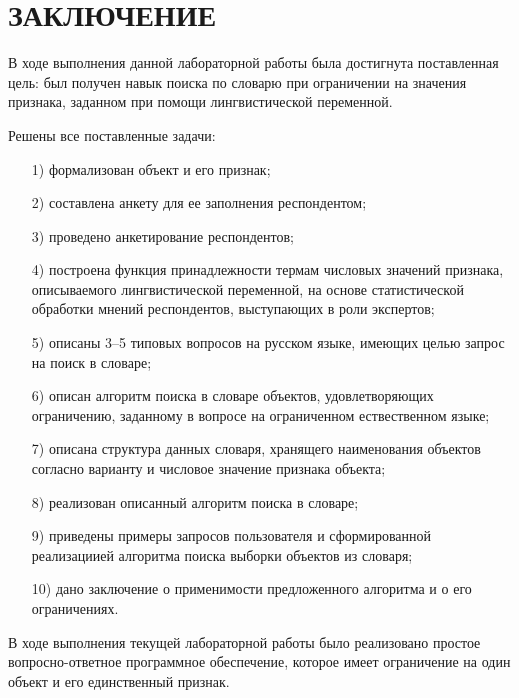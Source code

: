 {\centering \chapter*{ЗАКЛЮЧЕНИЕ}}

В ходе выполнения данной лабораторной работы была достигнута поставленная цель: был получен навык поиска по словарю при ограничении на значения признака, заданном при помощи лингвистической переменной.

Решены все поставленные задачи:
\begin{enumerate}
\item[1)] формализован объект и его признак;
\item[2)] составлена анкету для ее заполнения респондентом;
\item[3)] проведено анкетирование респондентов;
\item[4)] построена функция принадлежности термам числовых значений признака, описываемого лингвистической переменной, на основе статистической обработки мнений респондентов, выступающих в роли экспертов;
\item[5)] описаны 3--5 типовых вопросов на русском языке, имеющих целью запрос на поиск в словаре;
\item[6)] описан алгоритм поиска в словаре объектов, удовлетворяющих ограничению, заданному в вопросе на ограниченном ествественном языке;
\item[7)] описана структура данных словаря, хранящего наименования объектов согласно варианту и числовое значение признака объекта;
\item[8)] реализован описанный алгоритм поиска в словаре;
\item[9)] приведены примеры запросов пользователя и сформированной реализациией алгоритма поиска выборки объектов из словаря;
\item[10)] дано заключение о применимости предложенного алгоритма и о его ограничениях.
\end{enumerate}

В ходе выполнения текущей лабораторной работы было реализовано простое вопросно-ответное программное обеспечение, которое имеет ограничение на один объект и его единственный признак.

